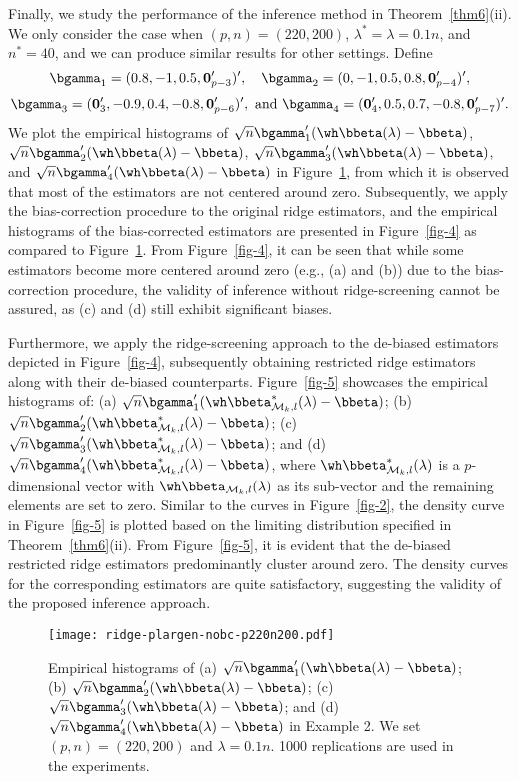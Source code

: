 {{Finally, we study the performance of the inference method in Theorem~\ref{thm6}(ii). We only consider the case when $(p,n)=(220,200)$, $\lambda^*=\lambda=0.1n$, and $n^*=40$, and we can produce similar results for other settings. Define
\[\bgamma_1=(0.8,-1,0.5,{\bf 0}_{p-3}')',\quad\bgamma_2=(0,-1,0.5,0.8,{\bf 0}_{p-4}')',\]
\[\bgamma_3=({\bf 0}_3',-0.9,0.4,-0.8,{\bf 0}_{p-6}')',\,\,\text{and}\,\,\bgamma_4=({\bf 0}_4',0.5,0.7,-0.8,{\bf 0}_{p-7}')'.\]
We plot the empirical histograms of  $\sqrt{n}\bgamma_1'(\wh\bbeta(\lambda)-\bbeta)$,   $\sqrt{n}\bgamma_2'(\wh\bbeta(\lambda)-\bbeta)$, $\sqrt{n}\bgamma_3'(\wh\bbeta(\lambda)-\bbeta)$, and  $\sqrt{n}\bgamma_4'(\wh\bbeta(\lambda)-\bbeta)$ in Figure~\ref{fig-3}, from which it is observed that most of the estimators are not centered around zero. Subsequently, we apply the bias-correction procedure to the original ridge estimators, and the empirical histograms of the bias-corrected estimators are presented in Figure~\ref{fig-4} as compared to Figure~\ref{fig-3}. From Figure~\ref{fig-4}, it can be seen that while some estimators become more centered around zero (e.g., (a) and (b)) due to the bias-correction procedure, the validity of inference without ridge-screening cannot be assured, as (c) and (d) still exhibit significant biases.

Furthermore, we apply the ridge-screening approach to the de-biased estimators depicted in Figure~\ref{fig-4}, subsequently obtaining restricted ridge estimators along with their de-biased counterparts. Figure~\ref{fig-5} showcases the empirical histograms of: (a) $\sqrt{n}\bgamma_1'(\wh\bbeta_{\mathcal{M}_k,l}^*(\lambda)-\bbeta)$; (b)  $\sqrt{n}\bgamma_2'(\wh\bbeta_{\mathcal{M}_k,l}^*(\lambda)-\bbeta)$; (c) $\sqrt{n}\bgamma_3'(\wh\bbeta_{\mathcal{M}_k,l}^*(\lambda)-\bbeta)$; and (d) $\sqrt{n}\bgamma_4'(\wh\bbeta_{\mathcal{M}_k,l}^*(\lambda)-\bbeta)$, where $\wh\bbeta_{\mathcal{M}_k,l}^*(\lambda)$ is a $p$-dimensional vector with $\wh\bbeta_{\mathcal{M}_k,l}(\lambda)$ as its sub-vector and the remaining elements are set to zero. Similar to the curves in Figure~\ref{fig-2}, the density curve in Figure~\ref{fig-5} is plotted based on the limiting distribution specified in Theorem~\ref{thm6}(ii). From Figure~\ref{fig-5}, it is evident that the de-biased restricted ridge estimators predominantly cluster around zero. The density curves for the corresponding estimators are quite satisfactory, suggesting the validity of the proposed inference approach.

\begin{figure}[ht]
\begin{center}
{\texttt{[image: ridge-plargen-nobc-p220n200.pdf]}}
\caption{Empirical histograms of (a) $\sqrt{n}\bgamma_1'(\wh\bbeta(\lambda)-\bbeta)$; (b)  $\sqrt{n}\bgamma_2'(\wh\bbeta(\lambda)-\bbeta)$; (c) $\sqrt{n}\bgamma_3'(\wh\bbeta(\lambda)-\bbeta)$; and (d) $\sqrt{n}\bgamma_4'(\wh\bbeta(\lambda)-\bbeta)$ in Example 2. We set $(p,n)=(220,200)$ and $\lambda=0.1n$. 1000 replications are used in the experiments.  }\label{fig-3}
\end{center}
\end{figure}


}}
